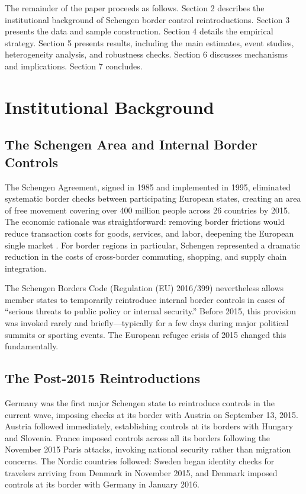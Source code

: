 \documentclass[12pt]{article}
\begin{document}
The remainder of the paper proceeds as follows. Section 2 describes the institutional background of Schengen border control reintroductions. Section 3 presents the data and sample construction. Section 4 details the empirical strategy. Section 5 presents results, including the main estimates, event studies, heterogeneity analysis, and robustness checks. Section 6 discusses mechanisms and implications. Section 7 concludes.


\section{Institutional Background}

\subsection{The Schengen Area and Internal Border Controls}

The Schengen Agreement, signed in 1985 and implemented in 1995, eliminated systematic border checks between participating European states, creating an area of free movement covering over 400 million people across 26 countries by 2015. The economic rationale was straightforward: removing border frictions would reduce transaction costs for goods, services, and labor, deepening the European single market \citep{Felbermayr2018}. For border regions in particular, Schengen represented a dramatic reduction in the costs of cross-border commuting, shopping, and supply chain integration.

The Schengen Borders Code (Regulation (EU) 2016/399) nevertheless allows member states to temporarily reintroduce internal border controls in cases of ``serious threats to public policy or internal security.'' Before 2015, this provision was invoked rarely and briefly---typically for a few days during major political summits or sporting events. The European refugee crisis of 2015 changed this fundamentally.

\subsection{The Post-2015 Reintroductions}

Germany was the first major Schengen state to reintroduce controls in the current wave, imposing checks at its border with Austria on September 13, 2015. Austria followed immediately, establishing controls at its borders with Hungary and Slovenia. France imposed controls across all its borders following the November 2015 Paris attacks, invoking national security rather than migration concerns. The Nordic countries followed: Sweden began identity checks for travelers arriving from Denmark in November 2015, and Denmark imposed controls at its border with Germany in January 2016.
\end{document}
